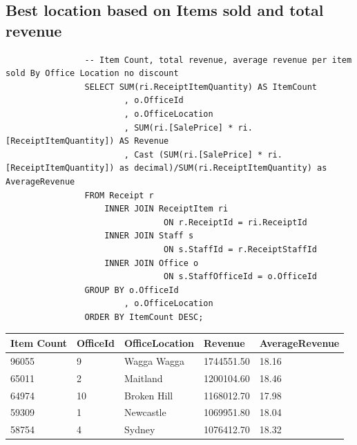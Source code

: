 \documentclass{article}
\begin{document}
             
            
            \subsection{Best location based on Items sold and total revenue}
               
                \begin{lstlisting}
				-- Item Count, total revenue, average revenue per item sold By Office Location no discount
				SELECT SUM(ri.ReceiptItemQuantity) AS ItemCount
						, o.OfficeId
						, o.OfficeLocation
						, SUM(ri.[SalePrice] * ri.[ReceiptItemQuantity]) AS Revenue
						, Cast (SUM(ri.[SalePrice] * ri.[ReceiptItemQuantity]) as decimal)/SUM(ri.ReceiptItemQuantity) as AverageRevenue
				FROM Receipt r
					INNER JOIN ReceiptItem ri
								ON r.ReceiptId = ri.ReceiptId
					INNER JOIN Staff s
								ON s.StaffId = r.ReceiptStaffId
					INNER JOIN Office o
								ON s.StaffOfficeId = o.OfficeId
				GROUP BY o.OfficeId
						, o.OfficeLocation
				ORDER BY ItemCount DESC;
                \end{lstlisting}

                \begin{table}[H]
                    \centering
                    \begin{tabular}{|l|l|l|l|l|}
                    \hline
                    Item Count & OfficeId & OfficeLocation & Revenue    & AverageRevenue \\ \hline
                    96055      & 9        & Wagga Wagga    & 1744551.50 & 18.16          \\ \hline
                    65011      & 2        & Maitland       & 1200104.60 & 18.46          \\ \hline
                    64974      & 10       & Broken Hill    & 1168012.70 & 17.98          \\ \hline
                    59309      & 1        & Newcastle      & 1069951.80 & 18.04          \\ \hline
                    58754      & 4        & Sydney         & 1076412.70 & 18.32          \\ \hline
                    \end{tabular}
                    \end{table}
\end{document}

